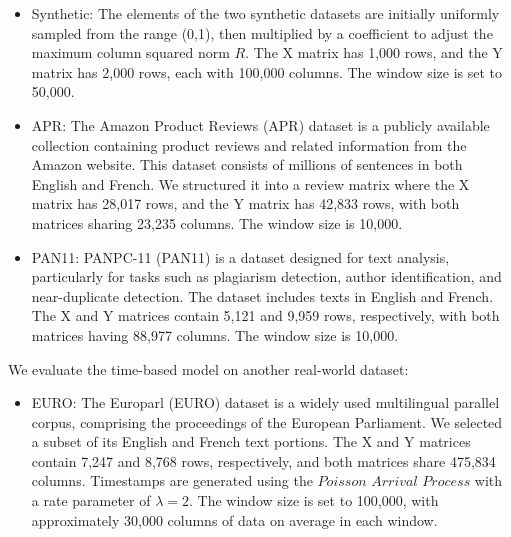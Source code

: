 \begin{itemize}
    \item Synthetic: The elements of the two synthetic datasets are initially uniformly sampled from the range (0,1), then multiplied by a coefficient to adjust the maximum column squared norm $R$. The X matrix has 1,000 rows, and the Y matrix has 2,000 rows, each with 100,000 columns. The window size is set to 50,000.
    \item APR: The Amazon Product Reviews (APR) dataset is a publicly available collection containing product reviews and related information from the Amazon website. This dataset consists of millions of sentences in both English and French. We structured it into a review matrix where the X matrix has 28,017 rows, and the Y matrix has 42,833 rows, with both matrices sharing 23,235 columns. The window size is 10,000.
    \item PAN11: PANPC-11 (PAN11) is a dataset designed for text analysis, particularly for tasks such as plagiarism detection, author identification, and near-duplicate detection. The dataset includes texts in English and French. The X and Y matrices contain 5,121 and 9,959 rows, respectively, with both matrices having 88,977 columns. The window size is 10,000.
\end{itemize}
We evaluate the time-based model on another real-world dataset:
\begin{itemize}
    \item EURO: The Europarl (EURO) dataset is a widely used multilingual parallel corpus, comprising the proceedings of the European Parliament. We selected a subset of its English and French text portions. The X and Y matrices contain 7,247 and 8,768 rows, respectively, and both matrices share 475,834 columns. Timestamps are generated using the $Poisson$ $Arrival$ $Process$ with a rate parameter of $\lambda=2$. The window size is set to 100,000, with approximately 30,000 columns of data on average in each window.
\end{itemize}

